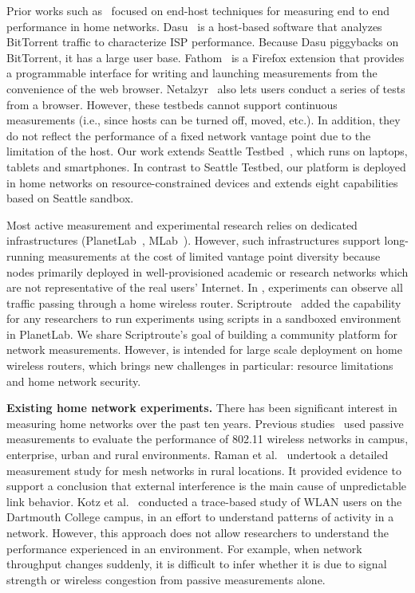 Prior works such as~\cite{sanchez2014measurement,dhawan2012fathom,kreibich2010netalyzr} focused on end-host techniques for measuring end to end performance in home networks. Dasu~\cite{sanchez2014measurement} is a host-based software that analyzes BitTorrent traffic to characterize ISP performance. Because Dasu piggybacks on BitTorrent, it has a large user base. Fathom~\cite{dhawan2012fathom} is a Firefox extension that provides a programmable interface for writing and launching measurements from the convenience of the web browser. Netalzyr~\cite{kreibich2010netalyzr} also lets users conduct a series of tests from a browser. However, these testbeds cannot support continuous measurements (i.e., since hosts can be turned off, moved, etc.). In addition, they do not reflect the performance of a fixed network vantage point due to the limitation of the host. Our work extends Seattle Testbed~\cite{cappos2009seattle}, which runs on laptops, tablets and smartphones. In contrast to Seattle Testbed, our platform is deployed in home networks on resource-constrained devices and extends eight capabilities based on Seattle sandbox.

Most active measurement and experimental research relies on dedicated infrastructures (PlanetLab~\cite{chun2003planetlab}, MLab~\cite{mlab}). However, such infrastructures support long-running measurements at the cost of limited vantage point diversity because nodes primarily deployed in well-provisioned academic or research networks which are not representative of the real users' Internet. In \sysname, experiments can observe all traffic passing through a home wireless router. Scriptroute~\cite{spring2003scriptroute} added the capability for any researchers to run experiments using scripts in a sandboxed environment in PlanetLab. We share Scriptroute's goal of building a community platform for network measurements. However, \sysname is intended for large scale deployment on home wireless routers, which brings new challenges in particular: resource limitations and home network security.

\textbf{Existing home network experiments.} There has been significant interest in measuring home networks over the past ten years. Previous studies~\cite{aguayo2004link,kotz2005analysis,raman2009feasibility} used passive measurements to evaluate the performance of 802.11 wireless networks in campus, enterprise, urban and rural environments. Raman et al.~\cite{raman2009feasibility} undertook a detailed measurement study for mesh networks in rural locations. It provided evidence to support a conclusion that external interference is the main cause of unpredictable link behavior. Kotz et al.~\cite{kotz2005analysis} conducted a trace-based study of WLAN users on the Dartmouth College campus, in an effort to understand patterns of activity in a network. However, this approach does not allow researchers to understand the performance experienced in an environment. For example, when network throughput changes suddenly, it is difficult to infer whether it is due to signal strength or wireless congestion from passive measurements alone.


